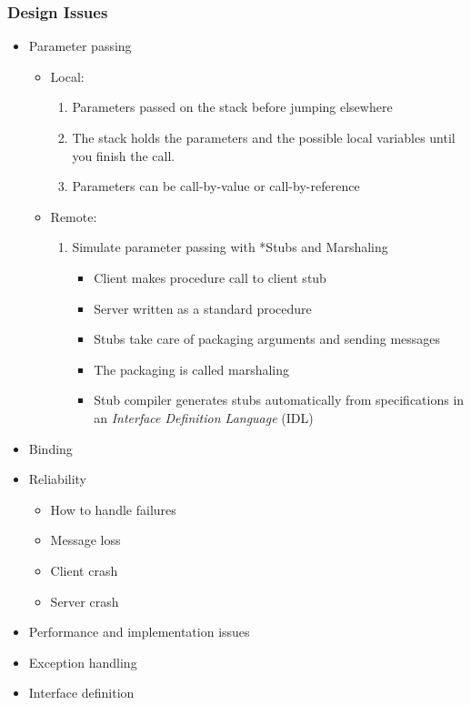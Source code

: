 \subsubsection{Design Issues}\label{subsubsec:RPC_Design_Issues}
\begin{itemize}[noitemsep]
\item Parameter passing
  \begin{itemize}[noitemsep]
  \item Local:
    \begin{enumerate}[noitemsep]
    \item Parameters passed on the stack before jumping elsewhere
    \item The stack holds the parameters and the possible local variables until you finish the call.
    \item Parameters can be call-by-value or call-by-reference
    \end{enumerate}
  \item Remote:
    \begin{enumerate}[noitemsep]
    \item Simulate parameter passing with *Stubs and Marshaling
      \begin{itemize}[noitemsep]
      \item Client makes procedure call to client stub
      \item Server written as a standard procedure
      \item Stubs take care of packaging arguments and sending messages
      \item The packaging is called marshaling
      \item Stub compiler generates stubs automatically from specifications in an \emph{Interface Definition Language} (IDL)
      \end{itemize}
    \end{enumerate}
  \end{itemize}
\item Binding
\item Reliability
  \begin{itemize}[noitemsep]
  \item How to handle failures
  \item Message loss
  \item Client crash
  \item Server crash
  \end{itemize}
\item Performance and implementation issues
\item Exception handling
\item Interface definition
\end{itemize}


